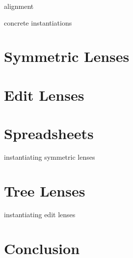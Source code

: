 \documentclass[12pt]{report}
\numberwithin{equation}{section}
\begin{document}
alignment

concrete instantiations

\chapter{Symmetric Lenses}



\chapter{Edit Lenses}

\mlinjargs\mlinjnoargs

\chapter{Spreadsheets}

instantiating symmetric lenses

\chapter{Tree Lenses}

instantiating edit lenses
% 

\chapter{Conclusion}

%
\end{document}
